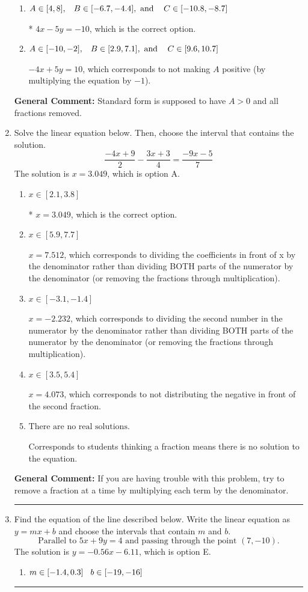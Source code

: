 \documentclass{extbook}[14pt]
\newcommand{\litem}[1]{\item #1

\rule{\textwidth}{0.4pt}}
\begin{document}
\begin{enumerate}
{\begin{enumerate}[label=\Alph*.]
 $-0.8x + 1y = 2.0$, which corresponds to not removing rational values for Standard Form.
\item \( A \in [4, 8], \hspace{3mm} B \in [-6.7, -4.4], \text{ and } \hspace{3mm} C \in [-10.8, -8.7] \)

* $4x - 5y = -10$, which is the correct option.
\item \( A \in [-10, -2], \hspace{3mm} B \in [2.9, 7.1], \text{ and } \hspace{3mm} C \in [9.6, 10.7] \)

 $-4x + 5y = 10$, which corresponds to not making $A$ positive (by multiplying the equation by $-1$).
\end{enumerate}

\textbf{General Comment:} Standard form is supposed to have $A > 0$ and all fractions removed.
}
\litem{
Solve the linear equation below. Then, choose the interval that contains the solution.
\[ \frac{-4x + 9}{2} - \frac{3x + 3}{4} = \frac{-9x -5}{7} \]The solution is \( x = 3.049 \), which is option A.\begin{enumerate}[label=\Alph*.]
\item \( x \in [2.1, 3.8] \)

* $x = 3.049$, which is the correct option.
\item \( x \in [5.9, 7.7] \)

 $x = 7.512$, which corresponds to dividing the coefficients in front of x by the denominator rather than dividing BOTH parts of the numerator by the denominator (or removing the fractions through multiplication).
\item \( x \in [-3.1, -1.4] \)

 $x = -2.232$, which corresponds to dividing the second number in the numerator by the denominator rather than dividing BOTH parts of the numerator by the denominator (or removing the fractions through multiplication).
\item \( x \in [3.5, 5.4] \)

 $x = 4.073$, which corresponds to not distributing the negative in front of the second fraction.
\item \( \text{There are no real solutions.} \)

Corresponds to students thinking a fraction means there is no solution to the equation.
\end{enumerate}

\textbf{General Comment:} If you are having trouble with this problem, try to remove a fraction at a time by multiplying each term by the denominator.
}
\litem{
Find the equation of the line described below. Write the linear equation as $ y=mx+b $ and choose the intervals that contain $m$ and $b$.
\[ \text{Parallel to } 5 x + 9 y = 4 \text{ and passing through the point } (7, -10). \]The solution is \( y = -0.56x - 6.11 \), which is option E.\begin{enumerate}[label=\Alph*.]
\item \( m \in [-1.4, 0.3] \hspace*{3mm} b \in [-19, -16] \)


\end{enumerate}}
\end{enumerate}
\end{document}
